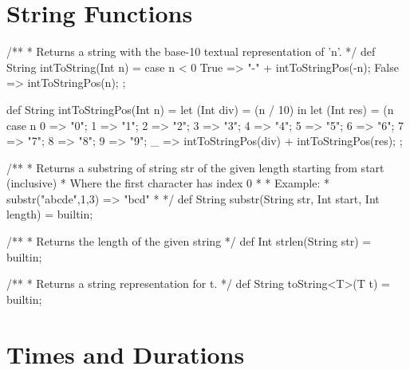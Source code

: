 \section{String Functions}

\begin{abscode}
/**
 * Returns a string with the base-10 textual representation of 'n'.
 */
def String intToString(Int n) =
  case n < 0 {
    True => "-" + intToStringPos(-n);
    False => intToStringPos(n);
  };

def String intToStringPos(Int n) =
  let (Int div) = (n / 10) in
  let (Int res) = (n %
  case n {
    0 => "0"; 1 => "1"; 2 => "2"; 3 => "3"; 4 => "4";
    5 => "5"; 6 => "6"; 7 => "7"; 8 => "8"; 9 => "9";
    \_ => intToStringPos(div) + intToStringPos(res);
  };

/**
 * Returns a substring of string str of the given length starting from start (inclusive)
 * Where the first character has index 0
 * 
 * Example:
 *    substr("abcde",1,3) => "bcd"
 *     
 */
def String substr(String str, Int start, Int length) = builtin;

/**
 * Returns the length of the given string
 */
def Int strlen(String str) = builtin;


/**
 * Returns a string representation for t.
 */
def String toString<T>(T t) = builtin;
\end{abscode}

\section{Times and Durations}

